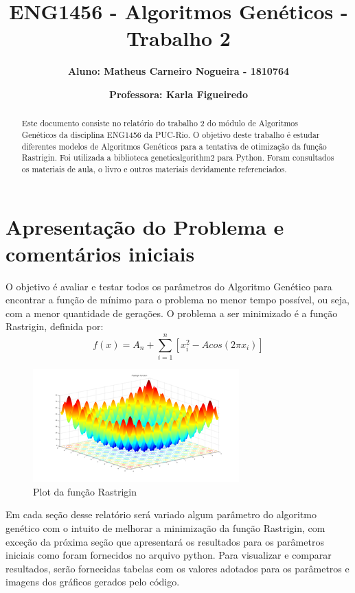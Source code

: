 \documentclass[12pt]{article}
\title{\textbf{ENG1456 - Algoritmos Genéticos - Trabalho 2}}
\author{\textbf{Aluno: Matheus Carneiro Nogueira - 1810764}}
\affil{}
\author{\textbf{Professora: Karla Figueiredo}}
\affil{}
\date{}
\begin{document}
	\maketitle
	
	
\begin{abstract}
	Este documento consiste no relatório do trabalho 2 do módulo de Algoritmos Genéticos da disciplina ENG1456 da PUC-Rio. O objetivo deste trabalho é estudar diferentes modelos de Algoritmos Genéticos para a tentativa de otimização da função Rastrigin. Foi utilizada a biblioteca geneticalgorithm2 para Python. Foram consultados os materiais de aula, o livro \cite{davis1991handbook} e outros materiais devidamente referenciados. 
\end{abstract}
	
\section{Apresentação do Problema e comentários iniciais}

O objetivo é avaliar e testar todos os parâmetros do Algoritmo Genético para encontrar a função de mínimo para o problema no menor tempo possível, ou seja, com a menor quantidade de gerações. O problema a ser minimizado é a função Rastrigin, definida por:
\begin{equation*}
	f(x)=A_n+\sum_{i=1}^{n}[x_i^2-Acos(2\pi x_i)]
\end{equation*}

\begin{figure}[H]
	\centering
	\includegraphics[width=0.7\linewidth]{Imagens/Rastrigin_function}
	\caption{Plot da função Rastrigin}
	\label{fig:rastriginfunction}
\end{figure}

Em cada seção desse relatório será variado algum parâmetro do algoritmo genético com o intuito de melhorar a minimização da função Rastrigin, com exceção da próxima seção que apresentará os resultados para os parâmetros iniciais como foram fornecidos no arquivo python. Para visualizar e comparar resultados, serão fornecidas tabelas com os valores adotados para os parâmetros e imagens dos gráficos gerados pelo código.
\end{document}
